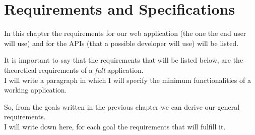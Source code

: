 \chapter{Requirements and Specifications}
	In this chapter the requirements for our web application (the one the end user will use) 
	and for the APIs (that a possible developer will use) will be listed.

	It is important to say that the requirements that will be listed below, are the 
	theoretical requirements of a \textit{full} application.\\
	I will write a paragraph in which I will specify the minimum functionalities of a working application.

	So, from the goals written in the previous chapter we can derive our general requirements.\\
	I will write down here, for each goal the requirements that will fulfill it.
